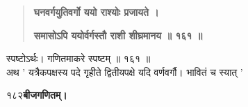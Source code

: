 \documentclass[11pt, openany]{book}
\begin{document}
\begin{sloppypar}
\begin{quote}
\hspace{1in}\textbf{घनवर्गयुतिवर्गो ययो राश्योः प्रजायते ।}

\hspace{1in}\textbf{समासोऽपि ययोर्वर्गस्तौ राशी शीघ्रमानय ॥ १६१ ॥}
\end{quote}

\hangindent=0.2in \hspace{0.2in}स्पष्टोऽर्थः। गणितमाकरे स्पष्टम् ॥ १६१ ॥\\

\hangindent=0.2in \hspace{0.2in}अथ ' यत्रैकपक्षस्य पदे गृहीते द्वितीयपक्षे यदि वर्णवर्गौ। भावितं च स्यात् '
\end{sloppypar}
\thispagestyle{empty}
\newpage

\onehalfspacing
१८२\hspace{2in}\textbf{बीजगणितम्।} 

\vspace{5mm}
\end{document}
